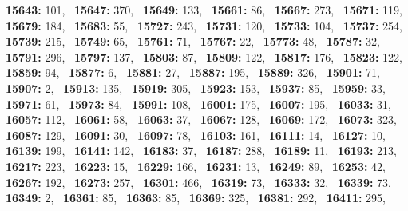 \textbf{15643:} 101,\allowbreak~ 
\textbf{15647:} 370,\allowbreak~ 
\textbf{15649:} 133,\allowbreak~ 
\textbf{15661:} 86,\allowbreak~ 
\textbf{15667:} 273,\allowbreak~ 
\textbf{15671:} 119,\allowbreak~ 
\textbf{15679:} 184,\allowbreak~ 
\textbf{15683:} 55,\allowbreak~ 
\textbf{15727:} 243,\allowbreak~ 
\textbf{15731:} 120,\allowbreak~ 
\textbf{15733:} 104,\allowbreak~ 
\textbf{15737:} 254,\allowbreak~ 
\textbf{15739:} 215,\allowbreak~ 
\textbf{15749:} 65,\allowbreak~ 
\textbf{15761:} 71,\allowbreak~ 
\textbf{15767:} 22,\allowbreak~ 
\textbf{15773:} 48,\allowbreak~ 
\textbf{15787:} 32,\allowbreak~ 
\textbf{15791:} 296,\allowbreak~ 
\textbf{15797:} 137,\allowbreak~ 
\textbf{15803:} 87,\allowbreak~ 
\textbf{15809:} 122,\allowbreak~ 
\textbf{15817:} 176,\allowbreak~ 
\textbf{15823:} 122,\allowbreak~ 
\textbf{15859:} 94,\allowbreak~ 
\textbf{15877:} 6,\allowbreak~ 
\textbf{15881:} 27,\allowbreak~ 
\textbf{15887:} 195,\allowbreak~ 
\textbf{15889:} 326,\allowbreak~ 
\textbf{15901:} 71,\allowbreak~ 
\textbf{15907:} 2,\allowbreak~ 
\textbf{15913:} 135,\allowbreak~ 
\textbf{15919:} 305,\allowbreak~ 
\textbf{15923:} 153,\allowbreak~ 
\textbf{15937:} 85,\allowbreak~ 
\textbf{15959:} 33,\allowbreak~ 
\textbf{15971:} 61,\allowbreak~ 
\textbf{15973:} 84,\allowbreak~ 
\textbf{15991:} 108,\allowbreak~ 
\textbf{16001:} 175,\allowbreak~ 
\textbf{16007:} 195,\allowbreak~ 
\textbf{16033:} 31,\allowbreak~ 
\textbf{16057:} 112,\allowbreak~ 
\textbf{16061:} 58,\allowbreak~ 
\textbf{16063:} 37,\allowbreak~ 
\textbf{16067:} 128,\allowbreak~ 
\textbf{16069:} 172,\allowbreak~ 
\textbf{16073:} 323,\allowbreak~ 
\textbf{16087:} 129,\allowbreak~ 
\textbf{16091:} 30,\allowbreak~ 
\textbf{16097:} 78,\allowbreak~ 
\textbf{16103:} 161,\allowbreak~ 
\textbf{16111:} 14,\allowbreak~ 
\textbf{16127:} 10,\allowbreak~ 
\textbf{16139:} 199,\allowbreak~ 
\textbf{16141:} 142,\allowbreak~ 
\textbf{16183:} 37,\allowbreak~ 
\textbf{16187:} 288,\allowbreak~ 
\textbf{16189:} 11,\allowbreak~ 
\textbf{16193:} 213,\allowbreak~ 
\textbf{16217:} 223,\allowbreak~ 
\textbf{16223:} 15,\allowbreak~ 
\textbf{16229:} 166,\allowbreak~ 
\textbf{16231:} 13,\allowbreak~ 
\textbf{16249:} 89,\allowbreak~ 
\textbf{16253:} 42,\allowbreak~ 
\textbf{16267:} 192,\allowbreak~ 
\textbf{16273:} 257,\allowbreak~ 
\textbf{16301:} 466,\allowbreak~ 
\textbf{16319:} 73,\allowbreak~ 
\textbf{16333:} 32,\allowbreak~ 
\textbf{16339:} 73,\allowbreak~ 
\textbf{16349:} 2,\allowbreak~ 
\textbf{16361:} 85,\allowbreak~ 
\textbf{16363:} 85,\allowbreak~ 
\textbf{16369:} 325,\allowbreak~ 
\textbf{16381:} 292,\allowbreak~ 
\textbf{16411:} 295,\allowbreak~ 
